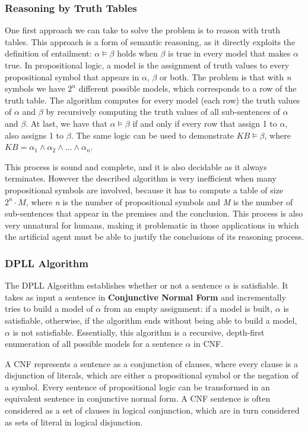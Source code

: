 \documentclass{article}
\begin{document}
\subsubsection{Reasoning by Truth Tables}
One first approach we can take to solve the problem is to reason with truth tables. This approach is a form of semantic reasoning, as it directly exploits the definition of entailment: $\alpha\models\beta$ holds when $\beta$ is true in every model that makes $\alpha$ true. In propositional logic, a model is the assignment of truth values to every propositional symbol that appears in $\alpha$, $\beta$ or both. The problem is that with \textit{n} symbols we have $2^n$ different possible models, which corresponds to a row of the truth table. The algorithm computes for every model (each row) the truth values of $\alpha$ and $\beta$ by recursively computing the truth values of all sub-sentences of $\alpha$ and $\beta$. At last, we have that $\alpha\models\beta$ if and only if every row that assign 1 to $\alpha$, also assigns 1 to $\beta$. The same logic can be used to demonstrate $KB\models\beta$, where $KB=\alpha_1\land\alpha_2\land...\land\alpha_n$.

This process is sound and complete, and it is also decidable as it always terminates. However the described algorithm is very inefficient when many propositional symbols are involved, because it has to compute a table of size $2^n\cdot M$, where \textit{n} is the number of propositional symbols and \textit{M} is the number of sub-sentences that appear in the premises and the conclusion. This process is also very unnatural for humans, making it problematic in those applications in which the artificial agent must be able to justify the conclusions of its reasoning process.

\subsubsection{DPLL Algorithm}
The DPLL Algorithm establishes whether or not a sentence $\alpha$ is satisfiable. It takes as input a sentence in \textbf{Conjunctive Normal Form} and incrementally tries to build a model of $\alpha$ from an empty assignment: if a model is built, $\alpha$ is satisfiable, otherwise, if the algorithm ends without being able to build a model, $\alpha$ is not satisfiable. Essentially, this algorithm is a recursive, depth-first enumeration of all possible models for a sentence $\alpha$ in CNF.

A CNF represents a sentence as a conjunction of clauses, where every clause is a disjunction of literals, which are either a propositional symbol or the negation of a symbol. Every sentence of propositional logic can be transformed in an equivalent sentence in conjunctive normal form. A CNF sentence is often considered as a set of clauses in logical conjunction, which are in turn considered as sets of literal in logical disjunction. 
\end{document}
